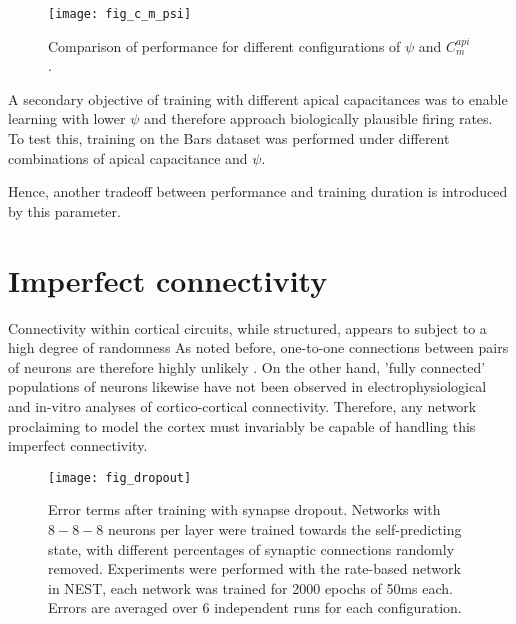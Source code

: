 \begin{figure}[h]
    \centering
    \texttt{[image: fig\_c\_m\_psi]}
    \caption[Comparison of performance for different configurations of $\psi$ and $C_m^{api}$]{Comparison of performance
    for different  configurations of $\psi$ and $C_m^{api}$.}
    \label{fig-c-m-psi}
\end{figure}

A secondary objective of training with different apical capacitances was to enable learning with lower $\psi$ and
therefore approach biologically plausible firing rates. To test this, training on the Bars dataset was performed under
different combinations of apical capacitance and $\psi$. 



Hence, another tradeoff between performance and training duration is introduced by this parameter.


\section{Imperfect connectivity}

Connectivity within cortical circuits, while structured, appears to subject to a high degree of randomness
\citep{potjans2014cell} As noted before, one-to-one connections between pairs of neurons are therefore highly unlikely
\citep{whittington2019theories}. On the other hand, 'fully connected' populations of neurons likewise have not been
observed in electrophysiological \citep{thomson2002synaptic} and in-vitro \citep{binzegger2004quantitative} analyses of
cortico-cortical connectivity. Therefore, any network proclaiming to model the cortex must invariably be capable of
handling this imperfect connectivity.

\begin{figure}[h]
    \centering
    \texttt{[image: fig\_dropout]}
    \caption[Error terms after training with synapse dropout]{Error terms after training with synapse dropout. Networks
        with $8-8-8$ neurons per layer were trained towards the self-predicting state, with different percentages of
        synaptic connections randomly removed. Experiments were performed with the rate-based network in NEST, each
        network was trained for 2000 epochs of 50ms each. Errors are averaged over 6 independent runs for each
        configuration.}
    \label{fig-dropout}
\end{figure}

